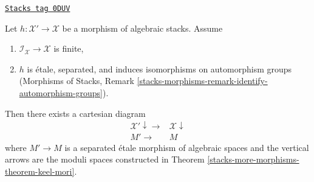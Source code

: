 \begin{lemma}
\label{stacks-more-morphisms-lemma-etale-separated-over-keel-mori}
\href{https://stacks.math.columbia.edu/tag/0DUV}{\texttt{Stacks tag 0DUV}}

Let $h : \mathcal{X}' \to \mathcal{X}$ be a morphism of algebraic stacks.
Assume
\begin{enumerate}
\item $\mathcal{I}_\mathcal{X} \to \mathcal{X}$ is finite,
\item $h$ is \'etale, separated, and induces isomorphisms on
automorphism groups (Morphisms of Stacks, Remark
\ref{stacks-morphisms-remark-identify-automorphism-groups}).
\end{enumerate}
Then there exists a cartesian diagram
$$
\begin{array}{cc}\mathcal{X}' \downarrow\longrightarrow & \mathcal{X} \downarrow \\ M' \longrightarrow & M\end{array}
$$
where $M' \to M$ is a separated \'etale morphism of algebraic spaces and
the vertical arrows are the moduli spaces constructed in
Theorem \ref{stacks-more-morphisms-theorem-keel-mori}.
\end{lemma}

